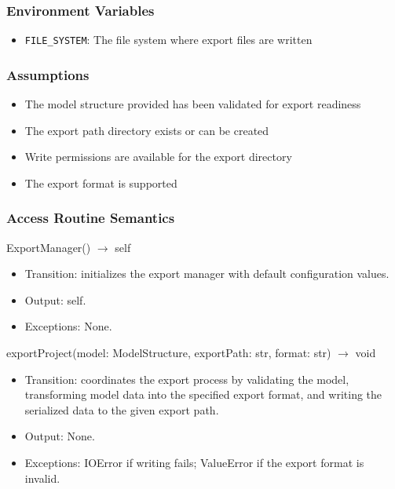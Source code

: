 \documentclass[12pt, titlepage]{article}
\begin{document}
\subsubsection{Environment Variables}

\begin{itemize}
\item \texttt{FILE\_SYSTEM}: The file system where export files are written
\end{itemize}

\subsubsection{Assumptions}

\begin{itemize}
\item The model structure provided has been validated for export readiness
\item The export path directory exists or can be created
\item Write permissions are available for the export directory
\item The export format is supported
\end{itemize}

\subsubsection{Access Routine Semantics}

ExportManager() $\rightarrow$ self
\begin{itemize}
  \item Transition: initializes the export manager with default configuration values.
  \item Output: self.
  \item Exceptions: None.
\end{itemize}

exportProject(model: ModelStructure, exportPath: str, format: str) $\rightarrow$ void
\begin{itemize}
  \item Transition: coordinates the export process by validating the model, transforming model data into the specified export format, and writing the serialized data to the given export path.
  \item Output: None.
  \item Exceptions: IOError if writing fails; ValueError if the export format is invalid.
\end{itemize}
\end{document}

